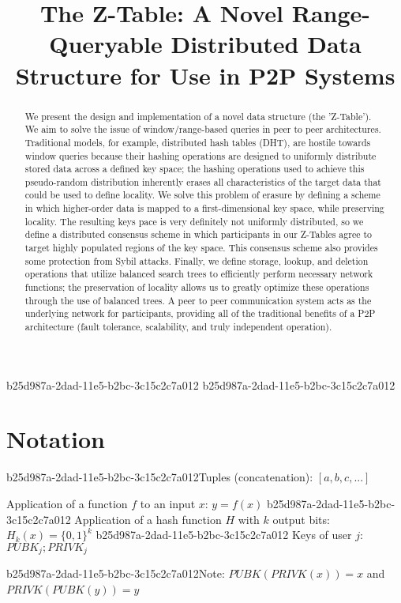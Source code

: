 \documentclass[12pt]{article}
\title{The Z-Table: A Novel Range-Queryable Distributed Data Structure for Use in P2P Systems}
\begin{document}
b25d987a-2dad-11e5-b2bc-3c15c2c7a012
b25d987a-2dad-11e5-b2bc-3c15c2c7a012\maketitle

\begin{abstract}
We present the design and implementation of a novel data structure (the 'Z-Table'). We aim to solve the issue of window/range-based queries in peer to peer architectures. Traditional models, for example,  distributed hash tables (DHT), are hostile towards window queries because their hashing operations are designed to uniformly distribute stored data across a defined key space; the hashing operations used to achieve this pseudo-random distribution inherently erases all characteristics of the target data that could be used to define locality. We solve this problem of erasure by defining a scheme in which higher-order data is mapped to a first-dimensional key space, while preserving locality. The resulting keys pace is very definitely not uniformly distributed, so we define a distributed consensus scheme in which participants in our Z-Tables agree to target highly populated regions of the key space. This consensus scheme also provides some protection from Sybil attacks. Finally, we define storage, lookup, and deletion operations that utilize balanced search trees to efficiently perform necessary network functions; the preservation of locality allows us to greatly optimize these operations through the use of balanced trees. A peer to peer communication system acts as the underlying network for participants, providing all of the traditional benefits of a P2P architecture (fault tolerance, scalability, and truly independent operation).
\end{abstract}

\section{Notation}

b25d987a-2dad-11e5-b2bc-3c15c2c7a012Tuples (concatenation): $[a,b,c,...]$

Application of a function $f$ to an input $x$: $y=f(x)$
b25d987a-2dad-11e5-b2bc-3c15c2c7a012
Application of a hash function $H$ with $k$ output bits: $H_{k}(x) = \{0,1\}^k$
b25d987a-2dad-11e5-b2bc-3c15c2c7a012
Keys of user $j$: $ PUBK_j; PRIVK_j $

b25d987a-2dad-11e5-b2bc-3c15c2c7a012Note: $PUBK(PRIVK(x)) = x$ and $PRIVK(PUBK(y)) = y$~
\end{document}
